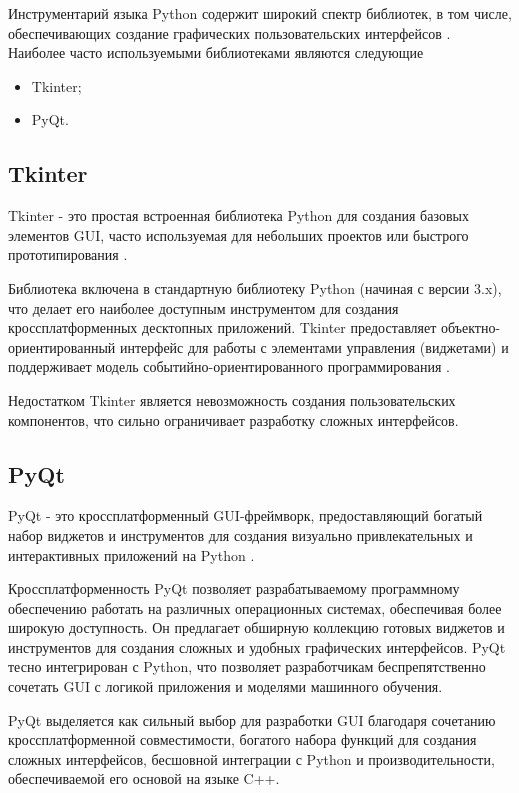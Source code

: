 Инструментарий языка Python содержит широкий спектр библиотек, в том числе,
обеспечивающих создание графических пользовательских интерфейсов
\cite{bib:tools:gui}. Наиболее часто используемыми библиотеками являются
следующие

\begin{itemize}
  \item Tkinter;
  \item PyQt.
\end{itemize}


\subsection{Tkinter}

Tkinter - это простая встроенная библиотека Python для создания базовых
элементов GUI, часто используемая для небольших проектов или быстрого
прототипирования \cite{bib:gui:tkinter}. 

Библиотека включена в стандартную библиотеку Python (начиная с версии 3.x), что
делает его наиболее доступным инструментом для создания кроссплатформенных
десктопных приложений. Tkinter предоставляет объектно-ориентированный интерфейс
для работы с элементами управления (виджетами) и поддерживает модель
событийно-ориентированного программирования \cite{bib:gui:model-based}.

Недостатком Tkinter является невозможность создания пользовательских
компонентов, что сильно ограничивает разработку сложных интерфейсов.

\subsection{PyQt}

PyQt - это кроссплатформенный GUI-фреймворк, предоставляющий богатый набор
виджетов и инструментов для создания визуально привлекательных и интерактивных
приложений на Python \cite{bib:gui:pyqt}.

Кроссплатформенность PyQt позволяет разрабатываемому программному обеспечению
работать на различных операционных системах, обеспечивая более широкую
доступность. Он предлагает обширную коллекцию готовых виджетов и инструментов
для создания сложных и удобных графических интерфейсов. PyQt тесно интегрирован
с Python, что позволяет разработчикам беспрепятственно сочетать GUI с логикой
приложения и моделями машинного обучения.

PyQt выделяется как сильный выбор для разработки GUI благодаря сочетанию
кроссплатформенной совместимости, богатого набора функций для создания сложных
интерфейсов, бесшовной интеграции с Python и производительности, обеспечиваемой
его основой на языке C++. 

